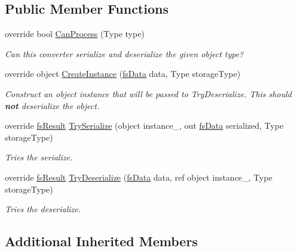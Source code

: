 \subsection*{Public Member Functions}
\begin{DoxyCompactItemize}
\item 
override bool \hyperlink{class_full_serializer_1_1_internal_1_1fs_i_enumerable_converter_a10f24874fda7fcb99a6a8380127dc8d0}{Can\+Process} (Type type)
\begin{DoxyCompactList}\small\item\em Can this converter serialize and deserialize the given object type? \end{DoxyCompactList}\item 
override object \hyperlink{class_full_serializer_1_1_internal_1_1fs_i_enumerable_converter_a787950b2cb51b536dc9fc01f5870f0d9}{Create\+Instance} (\hyperlink{class_full_serializer_1_1fs_data}{fs\+Data} data, Type storage\+Type)
\begin{DoxyCompactList}\small\item\em Construct an object instance that will be passed to Try\+Deserialize. This should {\bfseries not} deserialize the object. \end{DoxyCompactList}\item 
override \hyperlink{struct_full_serializer_1_1fs_result}{fs\+Result} \hyperlink{class_full_serializer_1_1_internal_1_1fs_i_enumerable_converter_a7aaf3b51583371f787df64c3eefc8c87}{Try\+Serialize} (object instance\+\_\+, out \hyperlink{class_full_serializer_1_1fs_data}{fs\+Data} serialized, Type storage\+Type)
\begin{DoxyCompactList}\small\item\em Tries the serialize. \end{DoxyCompactList}\item 
override \hyperlink{struct_full_serializer_1_1fs_result}{fs\+Result} \hyperlink{class_full_serializer_1_1_internal_1_1fs_i_enumerable_converter_a1585e62338f2abf99911f4fde9599daa}{Try\+Deserialize} (\hyperlink{class_full_serializer_1_1fs_data}{fs\+Data} data, ref object instance\+\_\+, Type storage\+Type)
\begin{DoxyCompactList}\small\item\em Tries the deserialize. \end{DoxyCompactList}\end{DoxyCompactItemize}
\subsection*{Additional Inherited Members}


